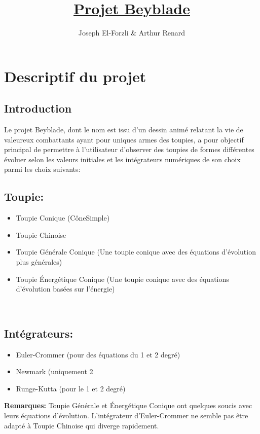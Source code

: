 \documentclass[a4paper]{article}%
\begin{document}
\author{Joseph El-Forzli & Arthur Renard}
\date{}
\title{\textbf{\underline{Projet Beyblade}}}
\maketitle

\section {Descriptif du projet}
	\subsection{Introduction}
		Le projet Beyblade, dont le nom est issu d'un dessin animé relatant la vie de valeureux combattants ayant pour uniques armes des toupies, a pour objectif principal de permettre à l'utilisateur d'observer des toupies de formes différentes évoluer selon les valeurs initiales et les intégrateurs numériques de son choix parmi les choix suivants: 
	
	\subsection {Toupie:} 
		\begin {itemize} 
			\item Toupie Conique (CôneSimple)
			\item Toupie Chinoise 
			\item Toupie Générale Conique (Une toupie conique avec des équations d'évolution plus générales)
			\item Toupie Énergétique Conique (Une toupie conique avec des équations d'évolution basées sur l'énergie)
		\end {itemize} \\
	
	\subsection {Intégrateurs:}
		\begin {itemize} 
			\item Euler-Crommer (pour des équations du 1\ier{} et 2\ieme{} degré)
			\item Newmark (uniquement 2\ieme{}
			\item Runge-Kutta (pour le 1\ier{} et 2\ieme{} degré)
		\end {itemize} 
	\textbf {Remarques: }Toupie Générale et Énergétique Conique ont quelques soucis avec leurs équations d'évolution. L'intégrateur d'Euler-Crommer ne semble pas être adapté à Toupie Chinoise qui diverge rapidement. 
		
\end{document}
